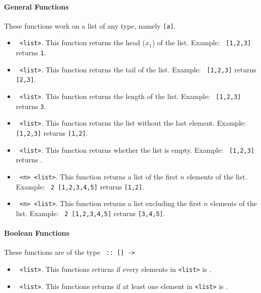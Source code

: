 \paragraph{General Functions} These functions work on a list of any type, namely \texttt{[a]}.
\begin{itemize}
  \item \texttt{ <list>}. This function returns the head ($x_1$) of the list. Example: \texttt{ [1,2,3]} returns \texttt{1}.
  \item \texttt{ <list>}. This function returns the tail of the list. Example: \texttt{ [1,2,3]} returns \texttt{[2,3]}.
  \item \texttt{ <list>}. This function returns the length of the list. Example: \texttt{ [1,2,3]} returns \texttt{3}.
  \item \texttt{ <list>}. This function returns the list without the last element. Example: \texttt{ [1,2,3]} returns \texttt{[1,2]}.
  \item \texttt{ <list>}. This function returns whether the list is empty. Example: \texttt{ [1,2,3]} returns \texttt{}.
  \item \texttt{ <n> <list>}. This function returns a list of the first $n$ elements of the list. Example: \texttt{ 2 [1,2,3,4,5]} returns \texttt{[1,2]}.
  \item \texttt{ <n> <list>}. This function returns a list excluding the first $n$ elements of the list. Example: \texttt{ 2 [1,2,3,4,5]} returns \texttt{[3,4,5]}.
\end{itemize}

\paragraph{Boolean Functions} These functions are of the type \texttt{ :: [] -> }
\begin{itemize}
  \item \texttt{ <list>}. This functions returns \texttt{} if every elements in \texttt{<list>} is \texttt{}.
  \item \texttt{ <list>}. This functions returns \texttt{} if at least one element in \texttt{<list>} is \texttt{}.
\end{itemize}

